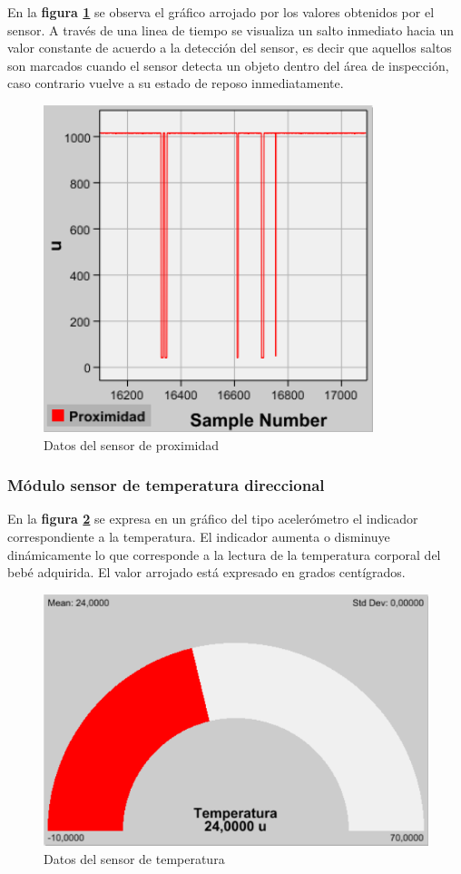 \documentclass{IEEEtran}
\begin{document}
				En la \textbf{figura \ref{proximidad}} se observa el gráfico arrojado por los valores obtenidos por el sensor. A través de una linea de tiempo se visualiza un salto inmediato hacia un valor constante de acuerdo a la detección del sensor, es decir que aquellos saltos son marcados cuando el sensor detecta un objeto dentro del área de inspección, caso contrario vuelve a su estado de reposo inmediatamente.
				\begin{figure}
					\centering
					\includegraphics[width=0.6\linewidth]{proximidad}
					\caption{Datos del sensor de proximidad}
					\label{proximidad}
				\end{figure}

			\subsubsection{Módulo sensor de temperatura direccional}

				En la \textbf{figura \ref{temperatura}} se expresa en un gráfico del tipo acelerómetro el indicador correspondiente a la temperatura. El indicador aumenta o disminuye dinámicamente lo que corresponde a la lectura de la temperatura corporal del bebé adquirida. El valor arrojado está expresado en grados centígrados.

				\begin{figure}
					\centering
					\includegraphics[width=0.7\linewidth]{temperatura}
					\caption{Datos del sensor de temperatura}
					\label{temperatura}
				\end{figure}
\end{document}
